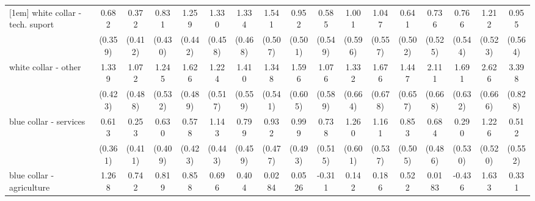 {\begin{tabular}{l*{16}{c}}
[1em]
white collar - tech. suport&       0.682         &       0.372         &       0.831         &       1.259\sym{**} &       1.330\sym{**} &       1.334\sym{**} &       1.541\sym{**} &       0.952         &       0.585         &       1.001         &       1.047         &       0.641         &       0.736         &       0.766         &       1.212\sym{*}  &       0.955         \\
                    &     (0.359)         &     (0.412)         &     (0.430)         &     (0.442)         &     (0.458)         &     (0.468)         &     (0.507)         &     (0.501)         &     (0.549)         &     (0.596)         &     (0.557)         &     (0.502)         &     (0.525)         &     (0.544)         &     (0.523)         &     (0.564)         \\
[1em]
white collar - other&       1.339\sym{**} &       1.072\sym{*}  &       1.245\sym{*}  &       1.626\sym{***}&       1.224\sym{*}  &       1.410\sym{*}  &       1.348\sym{*}  &       1.596\sym{**} &       1.076         &       1.332\sym{*}  &       1.676\sym{*}  &       1.447\sym{*}  &       2.111\sym{**} &       1.691\sym{**} &       2.626\sym{***}&       3.398\sym{***}\\
                    &     (0.423)         &     (0.488)         &     (0.532)         &     (0.489)         &     (0.517)         &     (0.559)         &     (0.541)         &     (0.605)         &     (0.589)         &     (0.664)         &     (0.678)         &     (0.657)         &     (0.668)         &     (0.632)         &     (0.666)         &     (0.828)         \\
[1em]
blue collar - services&       0.613         &       0.253         &       0.630         &       0.578         &       1.143\sym{**} &       0.799         &       0.932         &       0.999\sym{*}  &       0.738         &       1.260\sym{*}  &       1.161\sym{*}  &       0.853         &       0.684         &       0.290         &       1.226\sym{*}  &       0.512         \\
                    &     (0.361)         &     (0.411)         &     (0.409)         &     (0.423)         &     (0.443)         &     (0.459)         &     (0.477)         &     (0.493)         &     (0.515)         &     (0.601)         &     (0.537)         &     (0.505)         &     (0.486)         &     (0.530)         &     (0.520)         &     (0.552)         \\
[1em]
blue collar - agriculture&       1.268\sym{*}  &       0.742         &       0.819         &       0.858         &       0.696         &       0.404         &      0.0284         &      0.0526         &      -0.311         &       0.142         &       0.186         &       0.522         &      0.0183         &      -0.436         &       1.633\sym{*}  &       0.331         \\

\end{tabular}}
